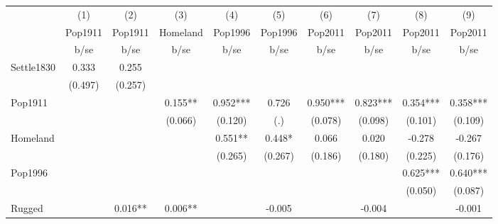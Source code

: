 {
\def\sym#1{\ifmmode^{#1}\else\(^{#1}\)\fi}
\begin{tabular}{l*{9}{c}}
\hline\hline
                    &\multicolumn{1}{c}{(1)}&\multicolumn{1}{c}{(2)}&\multicolumn{1}{c}{(3)}&\multicolumn{1}{c}{(4)}&\multicolumn{1}{c}{(5)}&\multicolumn{1}{c}{(6)}&\multicolumn{1}{c}{(7)}&\multicolumn{1}{c}{(8)}&\multicolumn{1}{c}{(9)}\\
                    &\multicolumn{1}{c}{Pop1911}&\multicolumn{1}{c}{Pop1911}&\multicolumn{1}{c}{Homeland}&\multicolumn{1}{c}{Pop1996}&\multicolumn{1}{c}{Pop1996}&\multicolumn{1}{c}{Pop2011}&\multicolumn{1}{c}{Pop2011}&\multicolumn{1}{c}{Pop2011}&\multicolumn{1}{c}{Pop2011}\\
                    &        b/se   &        b/se   &        b/se   &        b/se   &        b/se   &        b/se   &        b/se   &        b/se   &        b/se   \\
\hline
Settle1830          &       0.333   &       0.255   &               &               &               &               &               &               &               \\
                    &     (0.497)   &     (0.257)   &               &               &               &               &               &               &               \\
Pop1911             &               &               &       0.155** &       0.952***&       0.726   &       0.950***&       0.823***&       0.354***&       0.358***\\
                    &               &               &     (0.066)   &     (0.120)   &         (.)   &     (0.078)   &     (0.098)   &     (0.101)   &     (0.109)   \\
Homeland            &               &               &               &       0.551** &       0.448*  &       0.066   &       0.020   &      -0.278   &      -0.267   \\
                    &               &               &               &     (0.265)   &     (0.267)   &     (0.186)   &     (0.180)   &     (0.225)   &     (0.176)   \\
Pop1996             &               &               &               &               &               &               &               &       0.625***&       0.640***\\
                    &               &               &               &               &               &               &               &     (0.050)   &     (0.087)   \\
Rugged              &               &       0.016** &       0.006** &               &      -0.005   &               &      -0.004   &               &      -0.001   \\

\end{tabular}}
